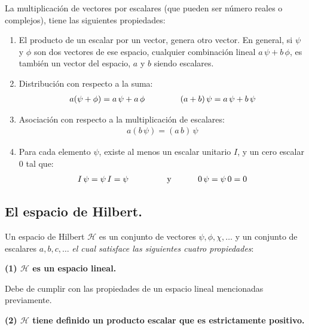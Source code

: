 La multiplicación de vectores por escalares (que pueden ser número reales o complejos), tiene las siguientes propiedades:
\begin{enumerate}
\item El producto de un escalar por un vector, genera otro vector. En general, si $\psi$ y $\phi$ son dos vectores de ese espacio, cualquier combinación lineal $a \, \psi + b \, \phi$, es también un vector del espacio, $a$ y $b$ siendo escalares.
\item Distribución con respecto a la suma:
\begin{align}
a (\psi + \phi) = a \, \psi + a \, \phi \hspace{1.5cm} (a + b) \, \psi = a \, \psi + b \, \psi
\label{eq:ecuacion_02_01}
\end{align}
\item Asociación con respecto a la multiplicación de escalares:
\begin{align}
a (b \, \psi) = (a \, b) \, \psi
\label{eq:ecuacion_02_02}
\end{align}
\item Para cada elemento $\psi$, existe al menos un escalar unitario $I$, y un cero escalar $0$ tal que:
\begin{align}
I \, \psi = \psi \, I = \psi \hspace{1.5cm} \mbox{ y } \hspace{1cm} 0 \, \psi = \psi \, 0 = 0
\label{eq:ecuacion_02_03}
\end{align}
\end{enumerate}

\subsection{El espacio de Hilbert.}

Un espacio de Hilbert $\mathcal{H}$ es un conjunto de vectores $\psi, \phi, \chi, \ldots$ y un conjunto de escalares $a, b, c, \ldots$ \emph{el cual satisface las siguientes cuatro propiedades}:

\textbf{(1) $\mathcal{H}$ es un espacio lineal.}

Debe de cumplir con las propiedades de un espacio lineal mencionadas previamente.

\textbf{(2) $\mathcal{H}$ tiene definido un producto escalar que es estrictamente positivo.}

